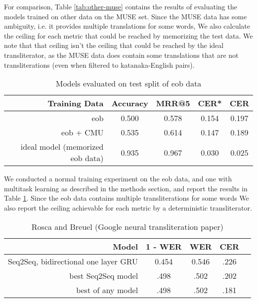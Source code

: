 \documentclass{article}
\begin{document}
For comparison,
Table \ref{tab:other-muse} contains the results of evaluating
the models trained on other data on the MUSE set.
Since the MUSE data has some ambiguity,
i.e. it provides multiple translations for some words,
We also calculate the ceiling for each metric
that could be reached by memorizing the test data.
We note that that ceiling isn't
the ceiling that could be reached by the ideal transliterator,
as the MUSE data does contain some translations that are not transliterations
(even when filtered to katanaka-English pairs).

\begin{table}[h]
  \centering
  \begin{tabular}{r | c c c c}
    Training Data & Accuracy & MRR@5 & CER* & CER \\
    \hline
    eob & 0.500 & 0.578 & 0.154 & 0.197 \\
    eob + CMU & 0.535 & 0.614 & 0.147 & 0.189 \\
    \hline
    ideal model (memorized eob data) & 0.935 & 0.967 & 0.030 & 0.025 \\
  \end{tabular}
  \caption{Models evaluated on test split of eob data}
  \label{tab:eob-results}
\end{table}

We conducted a normal training experiment on the eob data,
and one with multitask learning as described in the methods section,
and report the results in Table \ref{tab:eob-results}.
Since the eob data contains multiple transliterations for some words
We also report the ceiling achievable for each metric
by a deterministic transliterator.

\begin{table}[h]
  \centering
  \begin{tabular}{r | c c c c}
    Model & 1 - WER & WER & CER \\
    \hline
    Seq2Seq, bidirectional one layer GRU & 0.454 & 0.546 & .226 \\
    best Seq2Seq model & .498 & .502 & .202 \\
    best of any model & .498 & .502 & .181 \\
  \end{tabular}
  \caption{Rosca and Breuel \cite{Rosca2016SequencetosequenceNN} (Google neural
    transliteration paper)}
  \label{tab:baseline-results}
\end{table}
\end{document}

